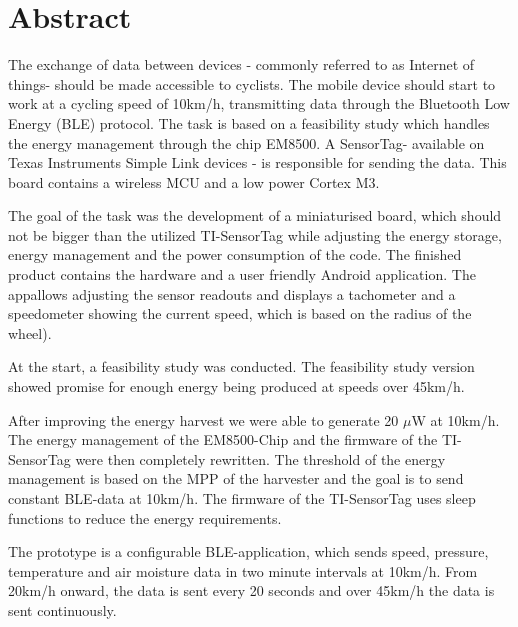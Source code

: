 \chapter*{Abstract}

The exchange of data between devices - commonly referred to as
\glqq Internet of things\grqq - should be made accessible to cyclists. The
mobile device should start to work at a cycling speed of 10km/h,
transmitting data through the Bluetooth Low Energy (BLE) protocol. The
task is based on a feasibility study which handles the energy
management through the chip EM8500. A \glqq SensorTag\grqq - available on Texas
Instruments Simple Link devices - is responsible for sending the data.
This board contains a wireless MCU and a low power Cortex M3.

The goal of the task was the development of a miniaturised board, which
should not be bigger than the utilized TI-SensorTag while adjusting the
energy storage, energy management and the power consumption of the
code. The finished product contains the hardware and a user friendly
Android application. The \glqq app\grqq allows adjusting the sensor readouts and
displays a tachometer and a speedometer showing the current speed, which is based on the radius of the wheel).

At the start, a feasibility study was conducted. The feasibility study
version showed promise for enough energy being produced at speeds
over 45km/h.

After improving the energy harvest we were able to generate 20
$\mu$W at 10km/h. The energy management of the EM8500-Chip and the
firmware of the TI-SensorTag were then completely rewritten. The
threshold of the energy management is based on the MPP of the harvester
and the goal is to send constant BLE-data at 10km/h. The firmware of
the TI-SensorTag uses sleep functions to reduce the energy
requirements.

The prototype is a configurable BLE-application, which sends speed,
pressure, temperature and air moisture data in two minute intervals at
10km/h. From 20km/h onward, the data is sent every 20 seconds and over
45km/h the data is sent continuously.
